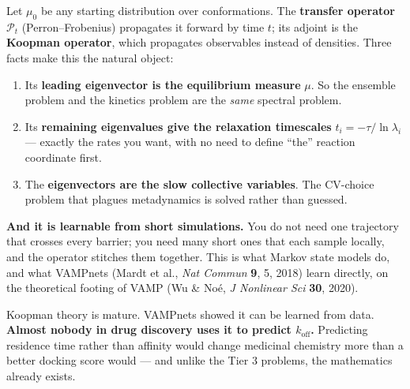 \begin{tier2}[title={Why this is the right object, and not just a nice picture}]
Let $\mu_0$ be any starting distribution over conformations. The \textbf{transfer operator}
$\mathcal{P}_t$ (Perron--Frobenius) propagates it forward by time $t$; its adjoint is the
\textbf{Koopman operator}, which propagates observables instead of densities. Three facts make this
the natural object:
\begin{enumerate}[label=\textbf{\arabic*.}]
\item Its \textbf{leading eigenvector is the equilibrium measure} $\mu$. So the ensemble problem and
 the kinetics problem are the \emph{same} spectral problem.
\item Its \textbf{remaining eigenvalues give the relaxation timescales} $t_i=-\tau/\ln\lambda_i$ ---
 exactly the rates you want, with no need to define ``the'' reaction coordinate first.
\item The \textbf{eigenvectors are the slow collective variables}. The CV-choice problem that plagues
 metadynamics is solved rather than guessed.
\end{enumerate}
\textbf{And it is learnable from short simulations.} You do not need one trajectory that crosses
every barrier; you need many short ones that each sample locally, and the operator stitches them
together. This is what Markov state models do, and what VAMPnets (Mardt et al., \textit{Nat Commun}
\textbf{9}, 5, 2018) learn directly, on the theoretical footing of VAMP (Wu \& Noé, \textit{J
Nonlinear Sci} \textbf{30}, 2020).
\end{tier2}

\begin{dobox}[title={The gap worth pointing a student at}]
Koopman theory is mature. VAMPnets showed it can be learned from data. \textbf{Almost nobody in drug
discovery uses it to predict $k_{\text{off}}$.} Predicting residence time rather than affinity would
change medicinal chemistry more than a better docking score would --- and unlike the Tier 3 problems,
the mathematics already exists.
\end{dobox}
